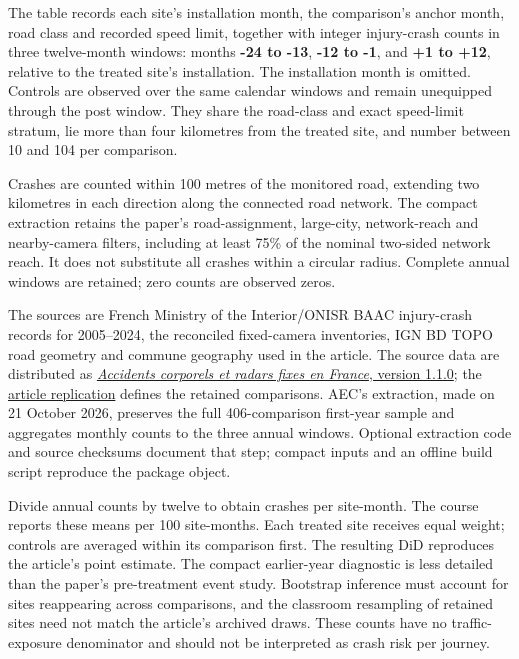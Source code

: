 \documentclass[
  11pt,
]{book}
\theoremstyle{definition}
\theoremstyle{definition}
\theoremstyle{definition}
\theoremstyle{definition}
\theoremstyle{remark}
\begin{document}
The table records each site's installation month, the comparison's anchor month, road class and recorded speed limit, together with integer injury-crash counts in three twelve-month windows: months \textbf{-24 to -13}, \textbf{-12 to -1}, and \textbf{+1 to +12}, relative to the treated site's installation. The installation month is omitted. Controls are observed over the same calendar windows and remain unequipped through the post window. They share the road-class and exact speed-limit stratum, lie more than four kilometres from the treated site, and number between 10 and 104 per comparison.

Crashes are counted within 100 metres of the monitored road, extending two kilometres in each direction along the connected road network. The compact extraction retains the paper's road-assignment, large-city, network-reach and nearby-camera filters, including at least 75\% of the nominal two-sided network reach. It does not substitute all crashes within a circular radius. Complete annual windows are retained; zero counts are observed zeros.

The sources are French Ministry of the Interior/ONISR BAAC injury-crash records for 2005--2024, the reconciled fixed-camera inventories, IGN BD TOPO road geometry and commune geography used in the article. The source data are distributed as \href{https://github.com/jrenne/accidents-radars-france}{\emph{Accidents corporels et radars fixes en France}, version 1.1.0}; the \href{https://github.com/jrenne/accidents-radars-replication}{article replication} defines the retained comparisons. AEC's extraction, made on 21 October 2026, preserves the full 406-comparison first-year sample and aggregates monthly counts to the three annual windows. Optional extraction code and source checksums document that step; compact inputs and an offline build script reproduce the package object.

Divide annual counts by twelve to obtain crashes per site-month. The course reports these means per 100 site-months. Each treated site receives equal weight; controls are averaged within its comparison first. The resulting DiD reproduces the article's point estimate. The compact earlier-year diagnostic is less detailed than the paper's pre-treatment event study. Bootstrap inference must account for sites reappearing across comparisons, and the classroom resampling of retained sites need not match the article's archived draws. These counts have no traffic-exposure denominator and should not be interpreted as crash risk per journey.
\end{document}
